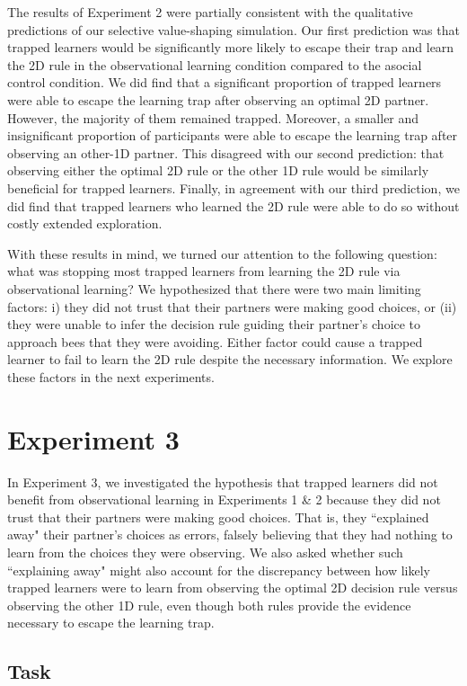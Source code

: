 \documentclass[11pt]{article} %
\begin{document}
The results of Experiment 2 were partially consistent with the qualitative predictions of our selective value-shaping simulation. Our first prediction was that trapped learners would be significantly more likely to escape their trap and learn the 2D rule in the observational learning condition compared to the asocial control condition. We did find that a significant proportion of trapped learners were able to escape the learning trap after observing an optimal 2D partner. However, the majority of them remained trapped. Moreover, a smaller and insignificant proportion of participants were able to escape the learning trap after observing an other-1D partner. This disagreed with our second prediction: that observing either the optimal 2D rule or the other 1D rule would be similarly beneficial for trapped learners. Finally, in agreement with our third prediction, we did find that trapped learners who learned the 2D rule were able to do so without costly extended exploration. 

With these results in mind, we turned our attention to the following question: what was stopping most trapped learners from learning the 2D rule via observational learning? We hypothesized that there were two main limiting factors: i) they did not trust that their partners were making good choices, or (ii) they were unable to infer the decision rule guiding their partner's choice to approach bees that they were avoiding. Either factor could cause a trapped learner to fail to learn the 2D rule despite the necessary information. We explore these factors in the next experiments. 

\section{Experiment 3}
In Experiment 3, we investigated the hypothesis that trapped learners did not benefit from observational learning in Experiments 1 \& 2 because they did not trust that their partners were making good choices. That is, they ``explained away" their partner's choices as errors, falsely believing that they had nothing to learn from the choices they were observing. We also asked whether such ``explaining away" might also account for the discrepancy between how likely trapped learners were to learn from observing the optimal 2D decision rule versus observing the other 1D rule, even though both rules provide the evidence necessary to escape the learning trap. 

\subsection{Task} 
\end{document}
